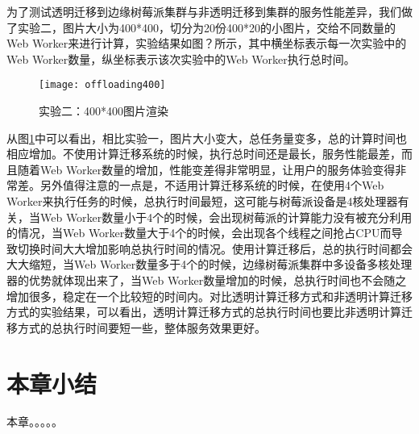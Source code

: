 为了测试透明迁移到边缘树莓派集群与非透明迁移到集群的服务性能差异，我们做了实验二，图片大小为400*400，切分为20份400*20的小图片，交给不同数量的Web Worker来进行计算，实验结果如图？所示，其中横坐标表示每一次实验中的Web Worker数量，纵坐标表示该次实验中的Web Worker执行总时间。

\begin{figure}[!htbp]
    \centering
    \texttt{[image: offloading400]}
    \caption{实验二：400*400图片渲染}
    \label{fig:computation_offloading_result_picture_400}
\end{figure}

从图\ref{fig:computation_offloading_result_picture_400}中可以看出，相比实验一，图片大小变大，总任务量变多，总的计算时间也相应增加。不使用计算迁移系统的时候，执行总时间还是最长，服务性能最差，而且随着Web Worker数量的增加，性能变差得非常明显，让用户的服务体验变得非常差。另外值得注意的一点是，不适用计算迁移系统的时候，在使用4个Web Worker来执行任务的时候，总执行时间最短，这可能与树莓派设备是4核处理器有关，当Web Worker数量小于4个的时候，会出现树莓派的计算能力没有被充分利用的情况，当Web Worker数量大于4个的时候，会出现各个线程之间抢占CPU而导致切换时间大大增加影响总执行时间的情况。使用计算迁移后，总的执行时间都会大大缩短，当Web Worker数量多于4个的时候，边缘树莓派集群中多设备多核处理器的优势就体现出来了，当Web Worker数量增加的时候，总执行时间也不会随之增加很多，稳定在一个比较短的时间内。对比透明计算迁移方式和非透明计算迁移方式的实验结果，可以看出，透明计算迁移方式的总执行时间也要比非透明计算迁移方式的总执行时间要短一些，整体服务效果更好。

\section{本章小结}
本章。。。。。